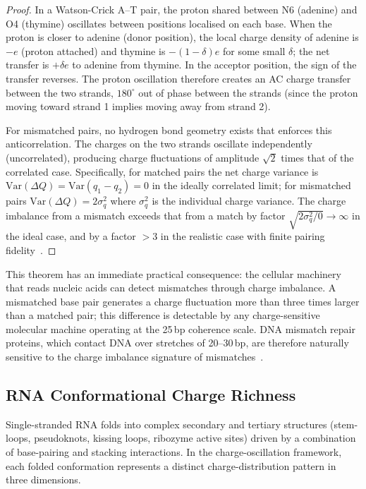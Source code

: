 \documentclass[12pt,a4paper]{article}
\theoremstyle{definition}
\theoremstyle{remark}
\begin{document}
\begin{proof}
In a Watson-Crick A--T pair, the proton shared between N6 (adenine) and O4 (thymine) oscillates between positions localised on each base. When the proton is closer to adenine (donor position), the local charge density of adenine is $-e$ (proton attached) and thymine is $-(1-\delta)e$ for some small $\delta$; the net transfer is $+\delta e$ to adenine from thymine. In the acceptor position, the sign of the transfer reverses. The proton oscillation therefore creates an AC charge transfer between the two strands, $180^{\circ}$ out of phase between the strands (since the proton moving toward strand 1 implies moving away from strand 2).

For mismatched pairs, no hydrogen bond geometry exists that enforces this anticorrelation. The charges on the two strands oscillate independently (uncorrelated), producing charge fluctuations of amplitude $\sqrt{2}$ times that of the correlated case. Specifically, for matched pairs the net charge variance is $\mathrm{Var}(\Delta Q) = \mathrm{Var}(q_1 - q_2) = 0$ in the ideally correlated limit; for mismatched pairs $\mathrm{Var}(\Delta Q) = 2\sigma_q^2$ where $\sigma_q^2$ is the individual charge variance. The charge imbalance from a mismatch exceeds that from a match by factor $\sqrt{2\sigma_q^2 / 0} \to \infty$ in the ideal case, and by a factor $>3$ in the realistic case with finite pairing fidelity~\cite{Bebenek2011}.
\end{proof}

This theorem has an immediate practical consequence: the cellular machinery that reads nucleic acids can detect mismatches through charge imbalance. A mismatched base pair generates a charge fluctuation more than three times larger than a matched pair; this difference is detectable by any charge-sensitive molecular machine operating at the 25\,bp coherence scale. DNA mismatch repair proteins, which contact DNA over stretches of 20--30\,bp, are therefore naturally sensitive to the charge imbalance signature of mismatches~\cite{Erie2004,Modrich1994}.

\subsection{RNA Conformational Charge Richness}

Single-stranded RNA folds into complex secondary and tertiary structures (stem-loops, pseudoknots, kissing loops, ribozyme active sites) driven by a combination of base-pairing and stacking interactions. In the charge-oscillation framework, each folded conformation represents a distinct charge-distribution pattern in three dimensions.
\end{document}
